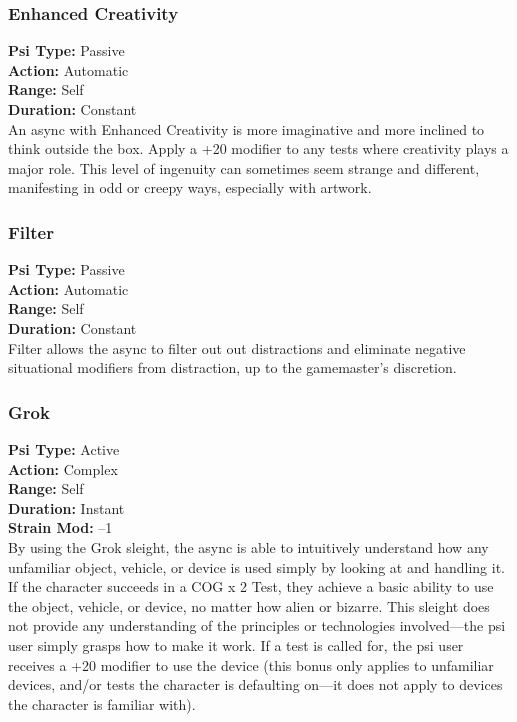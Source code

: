 \subsubsection{Enhanced Creativity}
\textbf{Psi Type:} Passive \\ 
\textbf{Action:} Automatic \\ 
\textbf{Range:} Self \\ 
\textbf{Duration:} Constant \\
An async with Enhanced Creativity is more imaginative
and more inclined to think outside the box.
Apply a +20 modifier to any tests where creativity
plays a major role. This level of ingenuity can
sometimes seem strange and different, manifesting
in odd or creepy ways, especially with artwork.

\subsubsection{Filter}
\textbf{Psi Type:} Passive \\ 
\textbf{Action:} Automatic \\ 
\textbf{Range:} Self \\ 
\textbf{Duration:} Constant \\
Filter allows the async to filter out out distractions
and eliminate negative situational modifiers from
distraction, up to the gamemaster’s discretion.

\subsubsection{Grok}
\textbf{Psi Type:} Active \\ 
\textbf{Action:} Complex \\ 
\textbf{Range:} Self \\ 
\textbf{Duration:} Instant \\
\textbf{Strain Mod:} –1 \\
By using the Grok sleight, the async is able to
intuitively understand how any unfamiliar object,
vehicle, or device is used simply by looking at and
handling it. If the character succeeds in a COG x 2
Test, they achieve a basic ability to use the object,
vehicle, or device, no matter how alien or bizarre.
This sleight does not provide any understanding of
the principles or technologies involved—the psi user
simply grasps how to make it work. If a test is called
for, the psi user receives a +20 modifier to use the
device (this bonus only applies to unfamiliar devices,
and/or tests the character is defaulting on—it does not
apply to devices the character is familiar with).

